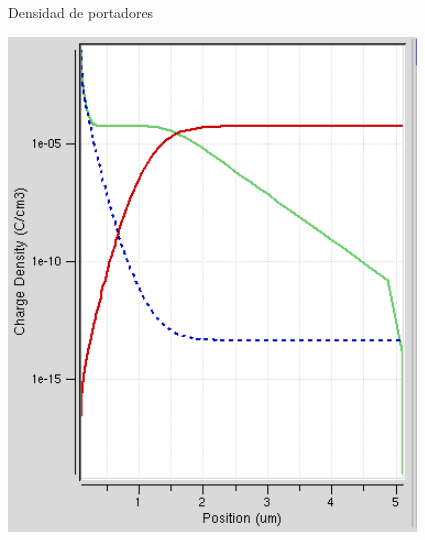 \documentclass{/home/daniel/GitHub/USC-Physics-Degree-Notes/Notes/Presentacion}
\begin{document}
\begin{frame}{Densidad de portadores}
\begin{minipage}{0.55\linewidth}
        \includegraphics[width=0.65\linewidth]{../Imagenes/1-Charge.png}
    \end{minipage}
\end{frame}
\end{document}

